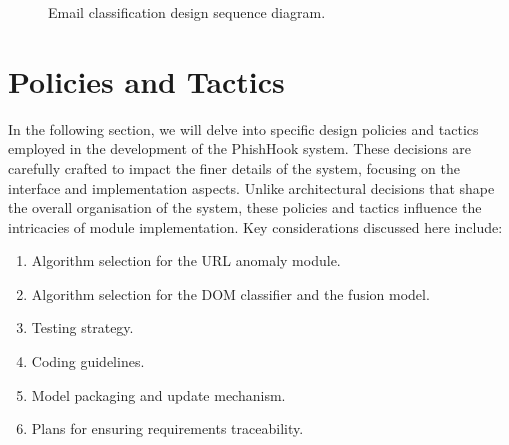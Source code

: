 \documentclass{FastFyp}
\begin{document}
\begin{figure}[H]
\centering
{}
\caption{Email classification design sequence diagram.}
\label{fig:seq-email}
\end{figure}


\section{Policies and Tactics}
\label{sec:policies}
In the following section, we will delve into specific design policies and tactics employed in the development of the PhishHook system. These decisions are carefully crafted to impact the finer details of the system, focusing on the interface and implementation aspects. Unlike architectural decisions that shape the overall organisation of the system, these policies and tactics influence the intricacies of module implementation. Key considerations discussed here include:

\begin{enumerate}
    \item Algorithm selection for the URL anomaly module.
    \item Algorithm selection for the DOM classifier and the fusion model.
    \item Testing strategy.
    \item Coding guidelines.
    \item Model packaging and update mechanism.
    \item Plans for ensuring requirements traceability.
\end{enumerate}
\end{document}

